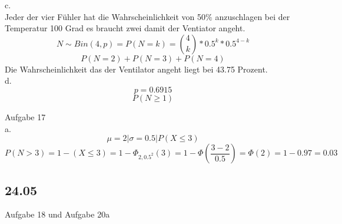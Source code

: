 c.\\

Jeder der vier Fühler hat die Wahrscheinlichkeit von 50$\%$ anzuschlagen bei der Temperatur 100 Grad es braucht zwei damit der Ventiator angeht.
\[N\sim Bin(4,p)=P(N=k)=\binom{4}{k}*0.5^k*0.5^{4-k}\]
\[P(N=2)+P(N=3)+P(N=4)\]
Die Wahrscheinlichkeit das der Ventilator angeht liegt bei 43.75 Prozent.\\

d.\\

\[p=0.6915\]\[ P(N\geq 1)\]

Aufgabe 17\\
a.\\
\[\mu =2 \vert \sigma =0.5 \vert P(X\leq 3)\]
\[P(N>3) = 1-(X\leq 3)= 1-\Phi _{2,0.5^2}(3)=1-\Phi (\frac{3-2}{0.5} )=\Phi (2)=1-0.97=0.03\]

\subsection{24.05}

Aufgabe 18 und Aufgabe 20a


